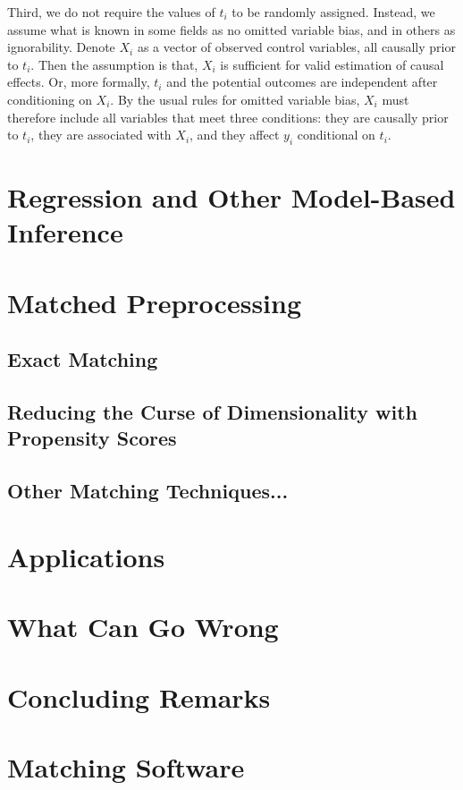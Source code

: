 \documentclass[11pt,titlepage]{article}
\begin{document}
Third, we do not require the values of $t_i$ to be randomly assigned.
Instead, we assume what is known in some fields as no omitted variable
bias, and in others as ignorability.  Denote $X_i$ as a vector of
observed control variables, all causally prior to $t_i$.  Then the
assumption is that, $X_i$ is sufficient for valid estimation of causal
effects.  Or, more formally, $t_i$ and the potential outcomes are
independent after conditioning on $X_i$.  By the usual rules for
omitted variable bias, $X_i$ must therefore include all variables that
meet three conditions: they are causally prior to $t_i$, they are
associated with $X_i$, and they affect $y_i$ conditional on $t_i$.


\section{Regression and Other Model-Based Inference}

\section{Matched Preprocessing}

\subsection{Exact Matching}

\subsection{Reducing the Curse of Dimensionality with Propensity Scores}

\subsection{Other Matching Techniques...}

\section{Applications}

\section{What Can Go Wrong}

\section{Concluding Remarks}

\appendix
\section{Matching Software}
\end{document}
